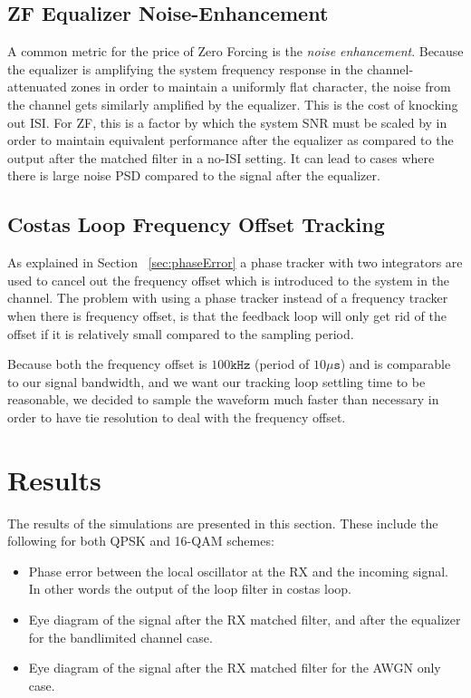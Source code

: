 \documentclass[]{article}
\begin{document}
\subsection{ZF Equalizer Noise-Enhancement}

A common metric for the price of Zero Forcing is the \emph{noise enhancement}.  Because the equalizer is amplifying the system frequency response in the channel-attenuated zones in order to maintain a uniformly flat character, the noise from the channel gets similarly amplified by the equalizer.  This is the cost of knocking out ISI.  For ZF, this is a factor by which the system SNR must be scaled by in order to maintain equivalent performance after the equalizer as compared to the output after the matched filter in a no-ISI setting.  It can lead to cases where there is large noise PSD compared to the signal after the equalizer.

\subsection{Costas Loop Frequency Offset Tracking}
As explained in Section ~\ref{sec:phaseError} a phase tracker with two integrators are used to cancel out the frequency offset which is introduced to the system in the channel. The problem with using a phase tracker instead of a frequency tracker when there is frequency offset, is that the feedback loop will only get rid of the offset if it is relatively small compared to the sampling period. 

Because both the frequency offset is $100 \mathtt{kHz}$ (period of $10 \mathtt{\mu s}$) and is comparable to our signal bandwidth, and we want our tracking loop settling time to be reasonable, we decided to sample the waveform much faster than necessary in order to have tie resolution to deal with the frequency offset.

\newpage
\section{Results}
\label{sec:results}
The results of the simulations are presented in this section. These include the following for both QPSK and 16-QAM schemes:
\begin{itemize}
\item Phase error between the local oscillator at the RX and the incoming signal. In other words the output of the loop filter in costas loop.
\item Eye diagram of the signal after the RX matched filter, and after the equalizer for the bandlimited channel case.
\item Eye diagram of the signal after the RX matched filter for the AWGN only case.
\end{itemize}
\end{document}

